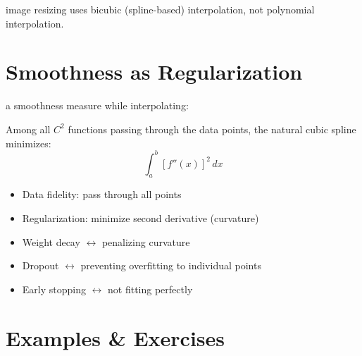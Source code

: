  image resizing uses bicubic (spline-based) interpolation, not polynomial interpolation.




\newpage
\section{Smoothness as Regularization}

 a smoothness measure while interpolating:

\begin{theorem}
Among all $C^2$ functions passing through the data points, the natural cubic spline minimizes:
\begin{equation}
    \int_a^b [f''(x)]^2 \, dx
\end{equation}
\end{theorem}

\begin{itemize}
    \item Data fidelity: pass through all points
    \item Regularization: minimize second derivative (curvature)
\end{itemize}


\begin{itemize}
    \item Weight decay $\leftrightarrow$ penalizing curvature
    \item Dropout $\leftrightarrow$ preventing overfitting to individual points
    \item Early stopping $\leftrightarrow$ not fitting perfectly
\end{itemize}





\newpage
\section{Examples \& Exercises}

